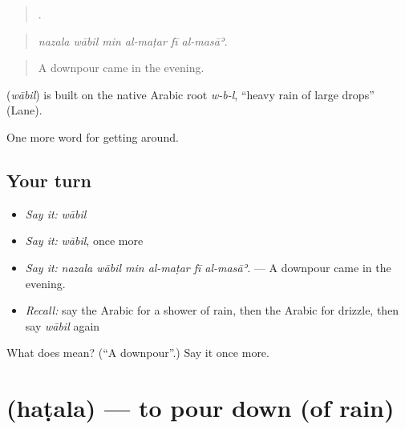 \begin{quote}
     .
\end{quote}

\begin{quote}
\emph{nazala wābil min al-maṭar fī al-masāʾ.}
\end{quote}

\begin{quote}
A downpour came in the evening.
\end{quote}

\begin{cousinweb}
\textbf{} (\emph{wābil}) is built on the native Arabic root \emph{w-b-l}, \textquotedblleft{}heavy rain of large drops\textquotedblright{} (Lane).
\end{cousinweb}

\begin{grammarlens}[title={What you've built}]
One more word for getting around.
\end{grammarlens}

\subsection*{Your turn}
\begin{itemize}
\raggedright
  \item \emph{Say it:} \emph{wābil}
  \item \emph{Say it:} \emph{wābil}, once more
  \item \emph{Say it:} \emph{nazala wābil min al-maṭar fī al-masāʾ.} — A downpour came in the evening.
  \item \emph{Recall:} say the Arabic for a shower of rain, then the Arabic for drizzle, then say \emph{wābil} again
\end{itemize}

\begin{tcolorbox}[breakable,colback=teal!4,colframe=teal!35!black,title={Before you move on}]
What does  mean? (\textquotedblleft{}A downpour\textquotedblright{}.) Say it once more.
\end{tcolorbox}
\section[\texorpdfstring{\ar{هطل} (haṭala)}{هطل (haṭala)}]{ (haṭala) — to pour down (of rain)}

\label{lesson:AR-C481-hatala}



